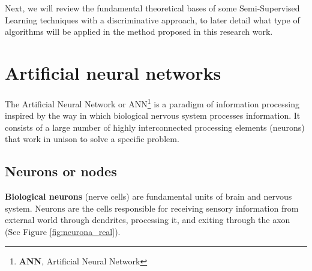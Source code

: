 \vspace{5mm} %

Next, we will review the fundamental theoretical bases of some Semi-Supervised Learning techniques with a discriminative approach, to later detail what type of algorithms will be applied in the method proposed in this research work.

\section{Artificial neural networks}

The Artificial Neural Network or ANN\footnote{\textbf{ANN}, Artificial Neural Network} is a paradigm of information processing inspired by the way in which biological nervous system processes information. It consists of a large number of highly interconnected processing elements (neurons) that work in unison to solve a specific problem.

\subsection{Neurons or nodes}

\textbf{Biological neurons} (nerve cells) are fundamental units of brain and nervous system. Neurons are the cells responsible for receiving sensory information from external world through dendrites, processing it, and exiting through the axon (See Figure \ref{fig:neurona_real}).

